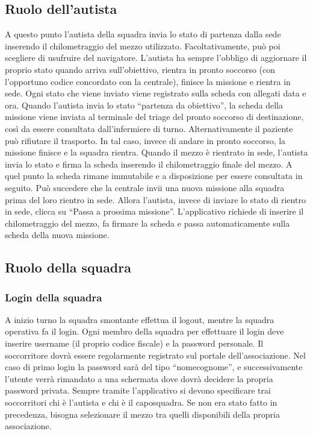 \documentclass{article}
\begin{document}
    \subsection{Ruolo dell’autista}
    A questo punto l’autista della squadra invia lo stato di partenza dalla sede inserendo il chilometraggio del mezzo utilizzato. Facoltativamente, può poi scegliere di usufruire del navigatore.
    L’autista ha sempre l’obbligo di aggiornare il proprio stato quando arriva sull’obiettivo, rientra in pronto soccorso (con l’opportuno codice concordato con la centrale), finisce la missione e rientra in sede. Ogni stato che viene inviato viene registrato sulla scheda con allegati data e ora.
    Quando l’autista invia lo stato “partenza da obiettivo”, la scheda della missione viene inviata al terminale del triage del pronto soccorso di destinazione, così da essere consultata dall’infermiere di turno.
    Alternativamente il paziente può rifiutare il trasporto. In tal caso, invece di andare in pronto soccorso, la missione finisce e la squadra rientra.
    Quando il mezzo è rientrato in sede, l’autista invia lo stato e firma la scheda inserendo il chilometraggio finale del mezzo. A quel punto la scheda rimane immutabile e a disposizione per essere consultata in seguito.
    Può succedere che la centrale invii una nuova missione alla squadra prima del loro rientro in sede.
    Allora l’autista, invece di inviare lo stato di rientro in sede, clicca su “Passa a prossima missione”. L’applicativo richiede di inserire il chilometraggio del mezzo, fa firmare la scheda e passa automaticamente sulla scheda della nuova missione.

    \subsection{Ruolo della squadra}
    \subsubsection{Login della squadra}
    A inizio turno la squadra smontante effettua il logout, mentre la squadra operativa fa il login.
    Ogni membro della squadra per effettuare il login deve inserire username (il proprio codice fiscale) e la password personale. Il soccorritore dovrà essere regolarmente registrato sul portale dell’associazione. Nel caso di primo login la password sarà del tipo “nomecognome”, e successivamente l’utente verrà rimandato a una schermata dove dovrà decidere la propria password privata.
    Sempre tramite l’applicativo si devono specificare trai soccorritori chi è l’autista e chi è il caposquadra.
    Se non era stato fatto in precedenza, bisogna selezionare il mezzo tra quelli disponibili della propria associazione.
\end{document}
